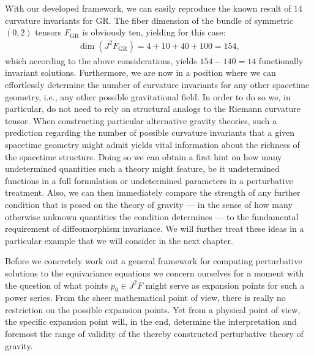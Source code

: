 With our developed framework, we can easily reproduce the known result of $14$ curvature invariants for GR. The fiber dimension of the bundle of symmetric $(0,2)$ tensors $F_{\text{GR}}$ is obviously ten, yielding for this case: 
\begin{align}
    \operatorname{dim}(J^2F_{\text{GR}}) = 4 + 10 + 40 + 100 = 154,
\end{align}
which according to the above considerations, yields $154-140=14$ functionally invariant solutions.
Furthermore, we are now in a position where we can effortlessly determine the number of curvature invariants for any other spacetime geometry, i.e., any other possible gravitational field. In order to do so we, in particular, do not need to rely on structural analogs to the Riemann curvature tensor.
When constructing particular alternative gravity theories,
such a prediction regarding the number of possible curvature invariants that a given spacetime geometry might admit yields vital information about the richness of the spacetime structure. 
Doing so we can obtain a first hint on how many undetermined quantities such a theory might feature, be it undetermined functions in a full formulation or undetermined parameters in a perturbative treatment.
Also, we can then immediately compare the strength of any further condition that is posed on the theory of gravity --- in the sense of how many otherwise unknown quantities the condition determines ---
to the fundamental requirement of diffeomorphism invariance.
We will further treat these ideas in a particular example that we will consider in the next chapter.

Before we concretely work out a general framework for computing perturbative solutions to the equivariance equations we concern ourselves for a moment with the question of what points $p_0 \in J^2F$ might serve as expansion points for such a power series. From the sheer mathematical point of view, there is really no restriction on the possible expansion points. Yet from a physical point of view, the specific expansion point will, in the end, determine the interpretation and foremost the range of validity of the thereby constructed perturbative theory of gravity. 

